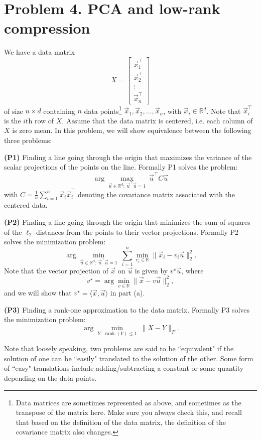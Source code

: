 \documentclass[
  12pt,
]{fphw}
\begin{document}
\newpage
\section*{Problem 4. PCA and low-rank compression}

We have a data matrix
\[
X =
\begin{bmatrix}
\vec x_1^\top\\
\vec x_2^\top\\
\vdots\\
\vec x_n^\top
\end{bmatrix}
\]
of size $n\times d$ containing $n$ data points\footnote{Data matrices are sometimes represented as above, and sometimes as the transpose of the matrix here. Make sure you always check this, and
recall that based on the definition of the data matrix, the definition of the covariance matrix also changes.}
$\vec x_1, \vec x_2, \ldots, \vec x_n$, with $\vec x_i \in \mathbb{R}^d$. Note
that $\vec x_i^\top$ is the $i$th row of $X$. Assume that the data matrix is centered, i.e. each column of $X$ is zero mean. In this
problem, we will show equivalence between the following three problems:

\textbf{(P1)} Finding a line going through the origin that maximizes the variance of the scalar projections of the points
on the line. Formally P1 solves the problem:
\[
\arg\max_{\vec u\in\mathbb{R}^d:\ \vec u^\top \vec u = 1}\ \vec u^\top C \vec u \tag{10}
\]
with $C = \frac{1}{n}\sum_{i=1}^n \vec x_i \vec x_i^\top$ denoting the covariance matrix associated with the centered data.

\textbf{(P2)} Finding a line going through the origin that minimizes the sum of squares of the $\ell_2$ distances from the
points to their vector projections. Formally P2 solves the minimization problem:
\[
\arg\min_{\vec u\in\mathbb{R}^d:\ \vec u^\top \vec u = 1}\ \sum_{i=1}^n \min_{v_i\in\mathbb{R}} \|\vec x_i - v_i \vec u\|_2^2. \tag{11}
\]
Note that the vector projection of $\vec x$ on $\vec u$ is given by $v^\star \vec u$, where
\[
v^\star = \arg\min_{v\in\mathbb{R}} \|\vec x - v\vec u\|_2^2, \tag{12}
\]
and we will show that $v^\star = \langle \vec x, \vec u\rangle$ in part (a).

\textbf{(P3)} Finding a rank-one approximation to the data matrix. Formally P3 solves the minimization problem:
\[
\arg\min_{Y:\ \operatorname{rank}(Y)\le 1}\ \|X - Y\|_F. \tag{13}
\]

Note that loosely speaking, two problems are said to be ``equivalent" if the solution of one can be ``easily"
translated to the solution of the other. Some form of ``easy" translations include adding/subtracting a constant or
some quantity depending on the data points.
\end{document}
